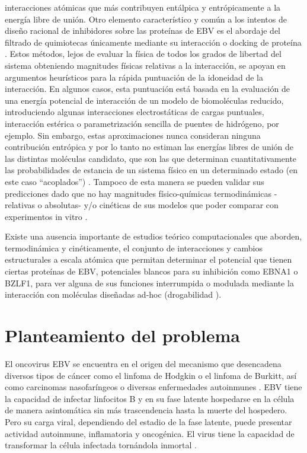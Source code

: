 \documentclass[12pt,letterpaper]{article} %
\newcommand{\red}[1]{\textcolor{red}{\textbf{#1}}}
\begin{document}
interacciones atómicas que más contribuyen entálpica y entrópicamente a la
energía libre de unión. Otro elemento característico y común a los intentos de
diseño racional de inhibidores sobre las proteínas de EBV es el abordaje del
filtrado de quimiotecas únicamente mediante su interacción o docking de proteína
\cite{Ferreira2015,Lavecchia2013}. Estos métodos, lejos de evaluar la física de
todos los grados de libertad del sistema obteniendo magnitudes físicas relativas
a la interacción, se apoyan en argumentos heurísticos para la rápida puntuación
de la idoneidad de la interacción. En algunos casos, esta puntuación está basada
en la evaluación de una energía potencial de interacción de un modelo de
biomoléculas reducido, introduciendo algunas interacciones electrostáticas de
cargas puntuales, interacción estérica o parametrización sencilla de puentes de
hidrógeno, por ejemplo. Sin embargo, estas aproximaciones nunca consideran
ninguna contribución entrópica y por lo tanto no estiman las energías libres de
unión de las distintas moléculas candidato, que son las que determinan
cuantitativamente las probabilidades de estancia de un sistema físico en un
determinado estado (en este caso ``acoplados'')
\red{\cite{Shirts2010a,Mortier2015}}. Tampoco de esta manera se pueden validar
sus predicciones dado que no hay magnitudes físico-químicas termodinámicas
-relativas o absolutas- y/o cinéticas de sus modelos que poder comparar con
experimentos in vitro \cite{Chaires2008}.

Existe una ausencia importante de estudios teórico computacionales que aborden,
termodinámica y cinéticamente, el conjunto de interacciones y cambios
estructurales a escala atómica que permitan determinar el potencial que tienen
ciertas proteínas de EBV, potenciales blancos para su inhibición como EBNA1 o
BZLF1, para ver alguna de sus funciones interrumpida o modulada mediante la
interacción con moléculas diseñadas ad-hoc (drogabilidad \cite{Barril2013}).


\section{Planteamiento del problema}

El oncovirus EBV se encuentra en el origen del mecanismo que desencadena
diversos tipos de cáncer como el linfoma de Hodgkin o el linfoma de Burkitt, así
como carcinomas nasofaríngeos o diversas enfermedades autoinmunes
\cite{Parkin2006,Cohen2011,Young2016,Draborg2013,Niller2008,ZurHausen2015}.
EBV tiene la capacidad de infectar linfocitos B y en su fase latente hospedarse
en la célula de manera asintomática sin más trascendencia hasta la muerte del
hospedero. Pero su carga viral, dependiendo del estadio
de la fase latente, puede presentar actividad autoinmune, inflamatoria y
oncogénica. El virus tiene la capacidad de transformar la célula infectada
tornándola inmortal
  \cite{Lieberman2014,Gupta2014,Damania2015,Klein2015,Minarovits2017}.
\end{document}
